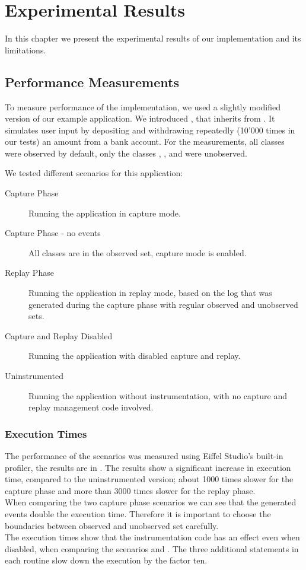 \chapter{Experimental Results}
In this chapter we present the experimental results of our implementation and its limitations.


\section{Performance Measurements}
To measure performance of the implementation, we used a slightly modified version of our example application. We introduced , that inherits from . It simulates user input by depositing and withdrawing repeatedly (10'000 times in our tests) an amount from a bank account. For the measurements, all classes were observed by default, only the classes , ,  and  were unobserved.

We tested different scenarios for this application:

\begin{description}
 \item [Capture Phase] Running the application in capture mode.
 \item [Capture Phase - no events] All classes are in the observed set, capture mode is enabled.
 \item [Replay Phase] Running the application in replay mode, based on the log that was generated during the capture phase with regular observed and unobserved sets.
 \item [Capture and Replay Disabled] Running the application with disabled capture and replay.
 \item [Uninstrumented] Running the application without instrumentation, with no capture and replay management code involved.
\end{description}


\subsection{Execution Times}
The performance of the scenarios was measured using Eiffel Studio's built-in profiler, the results are in . The results show a significant increase in execution time, compared to the uninstrumented version; about 1000 times slower for the capture phase and more than 3000 times slower for the replay phase.\\
When comparing the two capture phase scenarios we can see that the generated events double the execution time. Therefore it is important to choose the boundaries between observed and unobserved set carefully. \\
The execution times show that the instrumentation code has an effect even when disabled, when comparing the scenarios  and . The three additional  statements in each routine slow down the execution by the factor ten.

